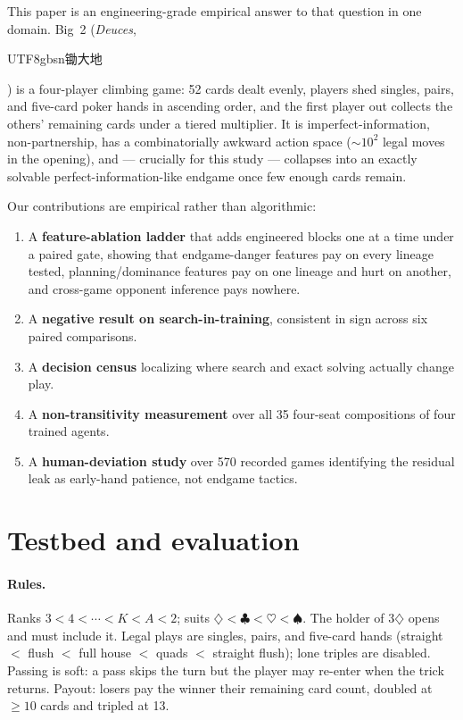 \documentclass[11pt]{article}
\begin{document}
This paper is an engineering-grade empirical answer to that question in
one domain. Big~2 (\emph{Deuces}, \begin{CJK}{UTF8}{gbsn}锄大地\end{CJK})
is a four-player climbing game: 52 cards dealt evenly, players shed
singles, pairs, and five-card poker hands in ascending order, and the
first player out collects the others' remaining cards under a tiered
multiplier. It is imperfect-information, non-partnership, has a
combinatorially awkward action space ($\sim 10^2$ legal moves in the
opening), and --- crucially for this study --- collapses into an
exactly solvable perfect-information-like endgame once few enough cards
remain.

Our contributions are empirical rather than algorithmic:

\begin{enumerate}
\item A \textbf{feature-ablation ladder} that adds engineered blocks one
  at a time under a paired gate, showing that endgame-danger features
  pay on every lineage tested, planning/dominance features pay on one
  lineage and hurt on another, and cross-game opponent inference pays
  nowhere.
\item A \textbf{negative result on search-in-training}, consistent in
  sign across six paired comparisons.
\item A \textbf{decision census} localizing where search and exact
  solving actually change play.
\item A \textbf{non-transitivity measurement} over all 35 four-seat
  compositions of four trained agents.
\item A \textbf{human-deviation study} over 570 recorded games
  identifying the residual leak as early-hand patience, not endgame
  tactics.
\end{enumerate}

\section{Testbed and evaluation}

\paragraph{Rules.} Ranks $3 < 4 < \cdots < K < A < 2$; suits
$\diamondsuit < \clubsuit < \heartsuit < \spadesuit$. The holder of
$3\diamondsuit$ opens and must include it. Legal plays are singles,
pairs, and five-card hands (straight $<$ flush $<$ full house $<$ quads
$<$ straight flush); lone triples are disabled. Passing is soft: a pass
skips the turn but the player may re-enter when the trick returns.
Payout: losers pay the winner their remaining card count, doubled at
$\geq 10$ cards and tripled at 13.
\end{document}
